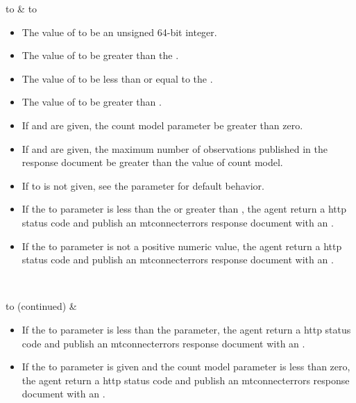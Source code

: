 \begin{longtabu}
\gls{to}
&
\glsdesc{to}
\begin{itemize}
    \item The value of \gls{to} \MUST be an unsigned 64-bit integer.
    \item The value of \gls{to} \MUST be greater than the .
    \item The value of \gls{to} \MUST be less than or equal to the .
    \item The value of \gls{to} \MUST be greater than .
    \item If  and  are given, the \gls{count model} parameter \MUST be greater than zero.
    \item If  and  are given, the maximum number of \glspl{observation} published in the \gls{response document} \MUSTNOT be greater than the value of \gls{count model}.
    \item If \gls{to} is not given, see the  parameter for default behavior.
    \item If the \gls{to} parameter is less than the  or greater than , the \gls{agent} \MUST return a  \gls{http status code} and \MUST publish an \gls{mtconnecterrors response document} with an  .
    \item If the \gls{to} parameter is not a positive numeric value, the \gls{agent} \MUST return a  \gls{http status code} and \MUST publish an \gls{mtconnecterrors response document} with an  .
\end{itemize}
\\ \hline

\gls{to}
(continued)
&
\begin{itemize}
    \item If the \gls{to} parameter is less than the  parameter, the \gls{agent} \MUST return a  \gls{http status code} and \MUST publish an \gls{mtconnecterrors response document} with an  .
    \item If the \gls{to} parameter is given and the \gls{count model} parameter is less than zero, the \gls{agent} \MUST return a  \gls{http status code} and \MUST publish an \gls{mtconnecterrors response document} with an  .
\end{itemize}
\\ \hline



\end{longtabu}